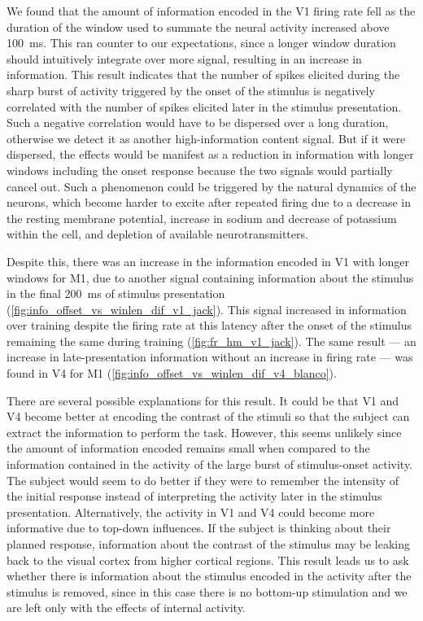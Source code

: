 We found that the amount of information encoded in the \ac{V1} firing rate fell as the duration of the window used to summate the neural activity increased above \SI{100}{\milli\second}.
This ran counter to our expectations, since a longer window duration should intuitively integrate over more signal, resulting in an increase in information.
This result indicates that the number of spikes elicited during the sharp burst of activity triggered by the onset of the stimulus is negatively correlated with the number of spikes elicited later in the stimulus presentation.
Such a negative correlation would have to be dispersed over a long duration, otherwise we detect it as another high-information content signal.
But if it were dispersed, the effects would be manifest as a reduction in information with longer windows including the onset response because the two signals would partially cancel out.
Such a phenomenon could be triggered by the natural dynamics of the neurons, which become harder to excite after repeated firing due to a decrease in the resting membrane potential, increase in sodium and decrease of potassium within the cell, and depletion of available neurotransmitters.

Despite this, there was an increase in the information encoded in \ac{V1} with longer windows for \ac{M1}, due to another signal containing information about the stimulus in the final \SI{200}{\milli\second} of stimulus presentation (\autoref{fig:info_offset_vs_winlen_dif_v1_jack}).
This signal increased in information over training despite the firing rate at this latency after the onset of the stimulus remaining the same during training (\autoref{fig:fr_hm_v1_jack}).
The same result --- an increase in late-presentation information without an increase in firing rate --- was found in \ac{V4} for \ac{M1} (\autoref{fig:info_offset_vs_winlen_dif_v4_blanco}).

There are several possible explanations for this result.
It could be that \ac{V1} and \ac{V4} become better at encoding the contrast of the stimuli so that the subject can extract the information to perform the task.
However, this seems unlikely since the amount of information encoded remains small when compared to the information contained in the activity of the large burst of stimulus-onset activity.
The subject would seem to do better if they were to remember the intensity of the initial response instead of interpreting the activity later in the stimulus presentation.
Alternatively, the activity in \ac{V1} and \ac{V4} could become more informative due to top-down influences.
If the subject is thinking about their planned response, information about the contrast of the stimulus may be leaking back to the visual cortex from higher cortical regions.
This result leads us to ask whether there is information about the stimulus encoded in the activity after the stimulus is removed, since in this case there is no bottom-up stimulation and we are left only with the effects of internal activity.


